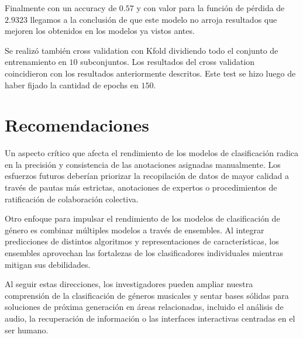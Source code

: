 \documentclass[colorinlistoftodos,twoside,twocolumn,10pt]{article} %
\begin{document}
Finalmente con un accuracy de $0.57$ y con valor para la funci\'on de p\'erdida de  $2.9323$ llegamos a la conclusi\'on de que este modelo no arroja resultados que mejoren los obtenidos en los modelos ya vistos antes.

Se realizó también cross validation con Kfold dividiendo todo el conjunto de entrenamiento en $10$ subconjuntos. Los resultados del cross validation coincidieron con los resultados anteriormente descritos. Este test se hizo luego de haber fijado la cantidad de epochs en $150$.


	\section{Recomendaciones}
  
Un aspecto crítico que afecta el rendimiento de los modelos de clasificación radica en la precisión y consistencia de las anotaciones asignadas manualmente. Los esfuerzos futuros deberían priorizar la recopilación de datos de mayor calidad a través de pautas más estrictas, anotaciones de expertos o procedimientos de ratificación de colaboración colectiva.

Otro enfoque para impulsar el rendimiento de los modelos de clasificación de género es combinar múltiples modelos a través de ensembles. Al integrar predicciones de distintos algoritmos y representaciones de características, los ensembles aprovechan las fortalezas de los clasificadores individuales mientras mitigan sus debilidades.  

  Al seguir estas direcciones, los investigadores pueden ampliar nuestra comprensión de la clasificación de géneros musicales y sentar bases sólidas para soluciones de próxima generación en áreas relacionadas, incluido el análisis de audio, la recuperación de información o las interfaces interactivas centradas en el ser humano.
  
\end{document}
